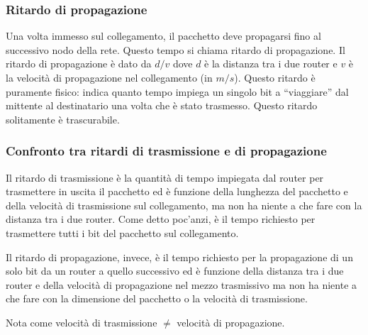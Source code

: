 \documentclass{book}
\begin{document}
\subsubsection{Ritardo di propagazione}
Una volta immesso sul collegamento, il pacchetto deve propagarsi fino al successivo nodo della rete. Questo tempo si chiama ritardo di propagazione.
Il ritardo di propagazione è dato da $d/v$ dove $d$ è la distanza tra i due router e $v$ è la velocità di propagazione nel collegamento (in $m/s$). Questo ritardo è puramente fisico: indica quanto tempo impiega un singolo bit a “viaggiare” dal mittente al destinatario una volta che è stato trasmesso. Questo ritardo solitamente è trascurabile. 
	
\subsubsection{Confronto tra ritardi di trasmissione e di propagazione}
Il ritardo di trasmissione è la quantità di tempo impiegata dal router per trasmettere in uscita il pacchetto ed è funzione della lunghezza del pacchetto e della velocità di trasmissione sul collegamento, ma non ha niente a che fare con la distanza tra i due router. Come detto poc'anzi, è il tempo richiesto per trasmettere tutti i bit del pacchetto sul collegamento.
	
Il ritardo di propagazione, invece, è il tempo richiesto per la propagazione di un solo bit da un router a quello successivo ed è funzione della distanza tra i due router e della velocità di propagazione nel mezzo trasmissivo ma non ha niente a che fare con la dimensione del pacchetto o la velocità di trasmissione.
	
Nota come velocità di trasmissione $\neq$ velocità di propagazione.

\begin{table}[ht]
	\centering
	\caption{Confronto tra velocità di propagazione e velocità di trasmissione.}
\end{table}
\end{document}

